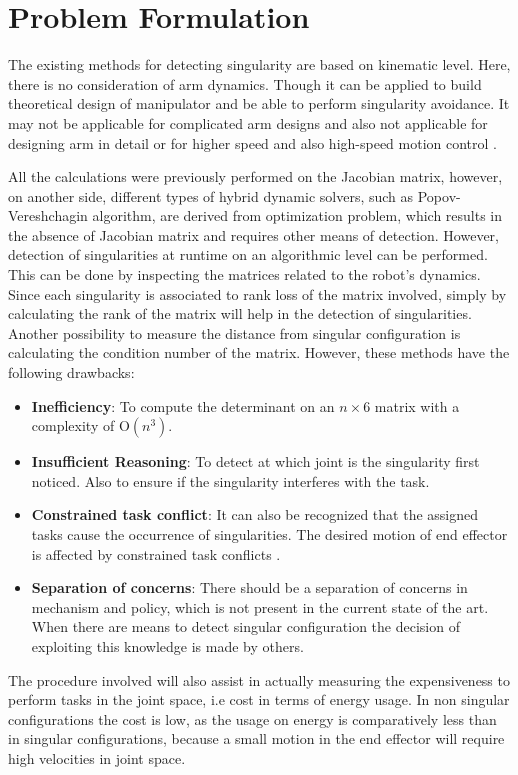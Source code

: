 
\chapter{Problem Formulation}
\label{Problem statement}
The existing methods for detecting singularity are based on kinematic level. Here, there is no consideration of arm dynamics. Though it can be applied to build theoretical design of manipulator and be able to perform singularity avoidance. It may not be applicable for complicated arm designs and also not applicable for designing arm in detail or for higher speed and also high-speed motion control \cite{yoshikawa1985dynamic}.


All the calculations were previously performed on the Jacobian matrix, however, on another side, different types of hybrid dynamic solvers, such as Popov-Vereshchagin algorithm, are derived from optimization problem, which results in the absence of Jacobian matrix and requires other means of detection. However, detection of singularities at runtime on an algorithmic level can be performed. This can be done by inspecting the matrices related to the robot's dynamics. Since each singularity is associated to rank loss of the matrix involved, simply by calculating the rank of the matrix will help in the detection of singularities. Another possibility to measure the distance from singular configuration is calculating the condition number of the matrix. However, these methods have the following drawbacks:
\begin{itemize}
	\item\textbf{Inefficiency}: To compute the determinant on an $n\times6$ matrix with a complexity of O$(n^3)$.
	\item\textbf{Insufficient Reasoning}: To detect at which joint is the singularity first noticed. Also to ensure if the singularity interferes with the task.
	\item\textbf{Constrained task conflict}: It can also be recognized that the assigned tasks cause the occurrence of singularities. The desired motion of end effector is affected by constrained task conflicts \cite{Chiaverini1997}.
	\item\textbf{Separation of concerns}: There should be  a separation of concerns in mechanism and policy, which is not present in the current state of the art. When there are means to detect singular configuration the decision of exploiting this knowledge is made by others.
\end{itemize}
The procedure involved will also assist in actually measuring the expensiveness to perform tasks in the joint space, i.e cost in terms of energy usage. In non singular configurations the cost is low, as the usage on energy is comparatively less than in singular configurations, because a small motion in the end effector will require high velocities in joint space. 
